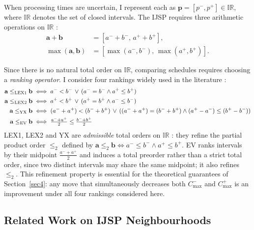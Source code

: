 \documentclass[preprint,12pt]{elsarticle}
\begin{document}
When processing times are uncertain, I represent each as $\mathbf{p}=[p^-, p^+] \in \mathbb{IR}$, where $\mathbb{IR}$ denotes the set of closed intervals. The IJSP requires three arithmetic operations on $\mathbb{IR}$ \cite{Moore2009}:
\begin{align}
\mathbf{a} + \mathbf{b}        &= [a^- + b^-,\, a^+ + b^+], \\
\max(\mathbf{a},\mathbf{b})    &= [\max(a^-,b^-),\, \max(a^+,b^+)].
\end{align}

Since there is no natural total order on $\mathbb{IR}$, comparing schedules requires choosing a \emph{ranking operator}. I consider four rankings widely used in the literature \cite{Bustince2013,Xu2006,Lei2012c}:
\begin{align}
\mathbf{a} \leq_{\rm LEX1} \mathbf{b} &\iff a^- < b^- \,\vee\, (a^- = b^- \wedge a^+ \leq b^+) \\
\mathbf{a} \leq_{\rm LEX2} \mathbf{b} &\iff a^+ < b^+ \,\vee\, (a^+ = b^+ \wedge a^- \leq b^-) \\
\mathbf{a} \leq_{\rm YX}   \mathbf{b} &\iff (a^- + a^+) < (b^- + b^+) \,\vee\, ((a^- + a^+) = (b^- + b^+) \wedge (a^+ - a^-) \leq (b^+ - b^-)) \\
\mathbf{a} \leq_{\rm EV}   \mathbf{b} &\iff \tfrac{a^- + a^+}{2} \leq \tfrac{b^- + b^+}{2}
\end{align}
LEX1, LEX2 and YX are \emph{admissible} total orders on $\mathbb{IR}$ \cite{Bustince2013}: they refine the partial product order $\leq_{2}$ defined by $\mathbf{a} \leq_{2} \mathbf{b} \iff a^- \leq b^- \wedge a^+ \leq b^+$. EV ranks intervals by their midpoint $\tfrac{a^-+a^+}{2}$ and induces a total preorder rather than a strict total order, since two distinct intervals may share the same midpoint; it also refines $\leq_{2}$. This refinement property is essential for the theoretical guarantees of Section~\ref{sec4}: any move that simultaneously decreases both $C^-_{\max}$ and $C^+_{\max}$ is an improvement under all four rankings considered here.

\subsection{Related Work on IJSP Neighbourhoods}
\label{sec2.3}
\end{document}
